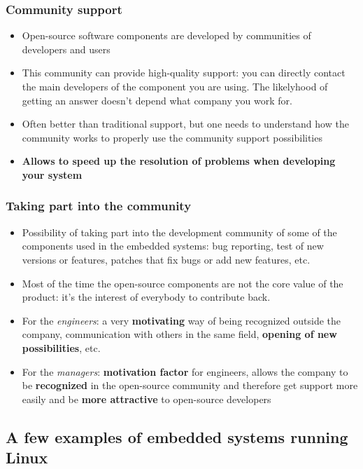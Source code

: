 \begin{frame}
  \frametitle{Community support}
  \begin{itemize}
  \item Open-source software components are developed by communities
    of developers and users
  \item This community can provide high-quality support: you can
    directly contact the main developers of the component you are
    using. The likelyhood of getting an answer doesn't depend what
    company you work for.
  \item Often better than traditional support, but one needs to
    understand how the community works to properly use the community
    support possibilities
  \item {\bf Allows to speed up the resolution of problems when
      developing your system}
  \end{itemize}
\end{frame}

\begin{frame}
  \frametitle{Taking part into the community}
  \begin{itemize}
  \item Possibility of taking part into the development community of
    some of the components used in the embedded systems: bug
    reporting, test of new versions or features, patches that fix bugs
    or add new features, etc.
  \item Most of the time the open-source components are not the core
    value of the product: it’s the interest of everybody to contribute
    back.
  \item For the {\em engineers}: a very {\bf motivating} way of being
    recognized outside the company, communication with others in the
    same field, {\bf opening of new possibilities}, etc.
  \item For the {\em managers}: {\bf motivation factor} for engineers,
    allows the company to be {\bf recognized} in the open-source
    community and therefore get support more easily and be {\bf more
      attractive} to open-source developers
\end{itemize}
\end{frame}

\subsection[Systems running Linux]{A few examples of embedded systems
  running Linux}

